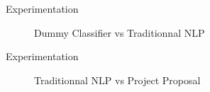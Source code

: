 \begin{frame}[label=exp]{Experimentation}
	
	\begin{figure}
		\caption{Dummy Classifier vs Traditionnal NLP}
		\centering
	\end{figure}
	
\end{frame}




\begin{frame}[label=exp]{Experimentation}
	\begin{figure}
		\caption{Traditionnal NLP vs Project Proposal}
		\centering
	\end{figure}
	
\end{frame}



